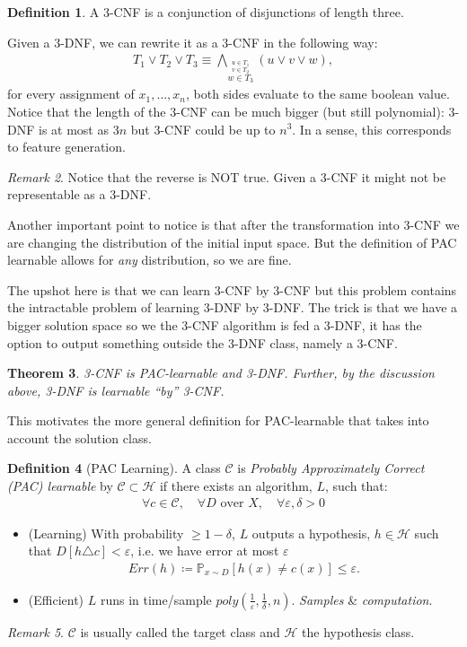 \documentclass[12pt, letterpaper]{article}
\numberwithin{equation}{section} %
\newcommand{\ul}{\underline}
\newcommand{\mb}{\mathbb}
\newcommand{\mc}{\mathcal}
\newcommand{\ve}{\varepsilon}
\newtheorem{theorem}{Theorem}[section]
\theoremstyle{definition}
\newtheorem{definition}[theorem]{Definition}
\theoremstyle{remark}
\newtheorem{remark}[theorem]{Remark}
\begin{document}
\begin{definition}
    A 3-CNF is a conjunction of disjunctions of length three.
\end{definition}

Given a 3-DNF, we can rewrite it as a 3-CNF in the following way:
\begin{align}
    T_1 \lor T_2 \lor T_3 \equiv \bigwedge\limits_{\stackrel{u\in T_1}{\stackrel{v\in T_2}{w\in T_3}}} \left(u \lor v \lor w\right),
\end{align}
for every assignment of $x_1,\ldots,x_n$, both sides evaluate to the same boolean value. Notice that the length of the 3-CNF can be much bigger (but still polynomial): 3-DNF is at most as $3n$ but 3-CNF could be up to $n^3$. In a sense, this corresponds to feature generation.
\begin{remark}
    Notice that the reverse is NOT true. Given a 3-CNF it might not be representable as a 3-DNF.

    Another important point to notice is that after the transformation into 3-CNF we are changing the distribution of the initial input space. But the definition of PAC learnable allows for \emph{any} distribution, so we are fine.
\end{remark}

The upshot here is that we can learn 3-CNF by 3-CNF but this problem contains the intractable problem of learning 3-DNF by 3-DNF. The trick is that we have a bigger solution space so we the 3-CNF algorithm is fed a 3-DNF, it has the option to output something outside the 3-DNF class, namely a 3-CNF.

\begin{theorem}
    3-CNF is PAC-learnable and 3-DNF. Further, by the discussion above, 3-DNF is learnable ``by'' 3-CNF.
\end{theorem}

This motivates the more general definition for PAC-learnable that takes into account the solution class.
\begin{definition}[PAC Learning]
	A class $\mc C$ is \emph{Probably Approximately Correct (PAC) learnable} by $\mc C \subset \mc H$ if there exists an algorithm, $L$, such that:
	\begin{align}
    	\forall c \in \mc C,\quad \forall D \textrm{ over }X,\quad \forall \ve,\delta > 0
	\end{align}
	\begin{itemize}
		\item (Learning) With probability $\geq 1 -\delta$, $L$ outputs a hypothesis, $\ul{h\in\mc H}$
		 such that $D[h\triangle c]<\ve$, i.e. we have error at most $\ve$
		\begin{align}
    		Err(h) \coloneqq \mb P_{x\sim D}[h(x) \ne c(x)] \leq \ve.
		\end{align}
		\item (Efficient) $L$ runs in time/sample $poly\left(\frac1\ve, \frac1\delta, n\right)$. \emph{Samples} \& \emph{computation}.
	\end{itemize}
\end{definition}
\begin{remark}
     $\mc C$ is usually called the target class and $\mc H$ the hypothesis class.
\end{remark}
\end{document}
